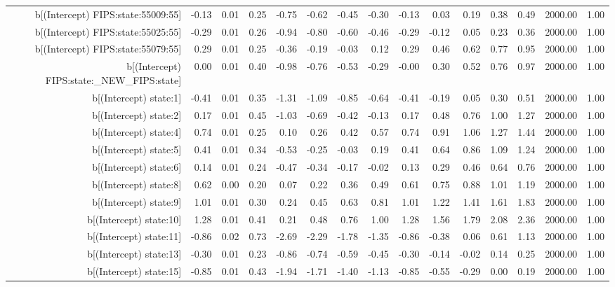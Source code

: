 \begin{table}[ht]
\begin{tabular}{rrrrrrrrrrrrrrr}
  b[(Intercept) FIPS:state:55009:55] & -0.13 & 0.01 & 0.25 & -0.75 & -0.62 & -0.45 & -0.30 & -0.13 & 0.03 & 0.19 & 0.38 & 0.49 & 2000.00 & 1.00 \\ 
  b[(Intercept) FIPS:state:55025:55] & -0.29 & 0.01 & 0.26 & -0.94 & -0.80 & -0.60 & -0.46 & -0.29 & -0.12 & 0.05 & 0.23 & 0.36 & 2000.00 & 1.00 \\ 
  b[(Intercept) FIPS:state:55079:55] & 0.29 & 0.01 & 0.25 & -0.36 & -0.19 & -0.03 & 0.12 & 0.29 & 0.46 & 0.62 & 0.77 & 0.95 & 2000.00 & 1.00 \\ 
  b[(Intercept) FIPS:state:\_NEW\_FIPS:state] & 0.00 & 0.01 & 0.40 & -0.98 & -0.76 & -0.53 & -0.29 & -0.00 & 0.30 & 0.52 & 0.76 & 0.97 & 2000.00 & 1.00 \\ 
  b[(Intercept) state:1] & -0.41 & 0.01 & 0.35 & -1.31 & -1.09 & -0.85 & -0.64 & -0.41 & -0.19 & 0.05 & 0.30 & 0.51 & 2000.00 & 1.00 \\ 
  b[(Intercept) state:2] & 0.17 & 0.01 & 0.45 & -1.03 & -0.69 & -0.42 & -0.13 & 0.17 & 0.48 & 0.76 & 1.00 & 1.27 & 2000.00 & 1.00 \\ 
  b[(Intercept) state:4] & 0.74 & 0.01 & 0.25 & 0.10 & 0.26 & 0.42 & 0.57 & 0.74 & 0.91 & 1.06 & 1.27 & 1.44 & 2000.00 & 1.00 \\ 
  b[(Intercept) state:5] & 0.41 & 0.01 & 0.34 & -0.53 & -0.25 & -0.03 & 0.19 & 0.41 & 0.64 & 0.86 & 1.09 & 1.24 & 2000.00 & 1.00 \\ 
  b[(Intercept) state:6] & 0.14 & 0.01 & 0.24 & -0.47 & -0.34 & -0.17 & -0.02 & 0.13 & 0.29 & 0.46 & 0.64 & 0.76 & 2000.00 & 1.00 \\ 
  b[(Intercept) state:8] & 0.62 & 0.00 & 0.20 & 0.07 & 0.22 & 0.36 & 0.49 & 0.61 & 0.75 & 0.88 & 1.01 & 1.19 & 2000.00 & 1.00 \\ 
  b[(Intercept) state:9] & 1.01 & 0.01 & 0.30 & 0.24 & 0.45 & 0.63 & 0.81 & 1.01 & 1.22 & 1.41 & 1.61 & 1.83 & 2000.00 & 1.00 \\ 
  b[(Intercept) state:10] & 1.28 & 0.01 & 0.41 & 0.21 & 0.48 & 0.76 & 1.00 & 1.28 & 1.56 & 1.79 & 2.08 & 2.36 & 2000.00 & 1.00 \\ 
  b[(Intercept) state:11] & -0.86 & 0.02 & 0.73 & -2.69 & -2.29 & -1.78 & -1.35 & -0.86 & -0.38 & 0.06 & 0.61 & 1.13 & 2000.00 & 1.00 \\ 
  b[(Intercept) state:13] & -0.30 & 0.01 & 0.23 & -0.86 & -0.74 & -0.59 & -0.45 & -0.30 & -0.14 & -0.02 & 0.14 & 0.25 & 2000.00 & 1.00 \\ 
  b[(Intercept) state:15] & -0.85 & 0.01 & 0.43 & -1.94 & -1.71 & -1.40 & -1.13 & -0.85 & -0.55 & -0.29 & 0.00 & 0.19 & 2000.00 & 1.00 \\ 

\end{tabular}
\end{table}
